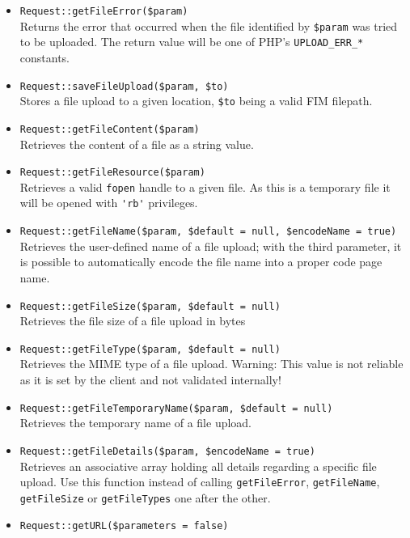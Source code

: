 \documentclass{scrartcl}
\begin{document}
\begin{itemize}
         \item \lstinline!Request::getFileError($param)! \\
            Returns the error that occurred when the file identified by \lstinline!$param! was tried to be uploaded. The return value will be one of PHP's \lstinline!UPLOAD_ERR_*! constants.
         \item \lstinline!Request::saveFileUpload($param, $to)! \\
            Stores a file upload to a given location, \lstinline!$to! being a valid FIM filepath.
         \item \lstinline!Request::getFileContent($param)! \\
            Retrieves the content of a file as a string value.
         \item \lstinline!Request::getFileResource($param)! \\
            Retrieves a valid \lstinline!fopen! handle to a given file. As this is a temporary file it will be opened with \lstinline!'rb'! privileges.
         \item \lstinline!Request::getFileName($param, $default = null, $encodeName = true)! \\
            Retrieves the user-defined name of a file upload; with the third parameter, it is possible to automatically encode the file name into a proper code page name.
         \item \lstinline!Request::getFileSize($param, $default = null)! \\
            Retrieves the file size of a file upload in bytes
         \item \lstinline!Request::getFileType($param, $default = null)! \\
            Retrieves the MIME type of a file upload. Warning: This value is not reliable as it is set by the client and not validated internally!
         \item \lstinline!Request::getFileTemporaryName($param, $default = null)! \\
            Retrieves the temporary name of a file upload.
         \item \lstinline!Request::getFileDetails($param, $encodeName = true)! \\
            Retrieves an associative array holding all details regarding a specific file upload. Use this function instead of calling \lstinline!getFileError!, \lstinline!getFileName!, \lstinline!getFileSize! or \lstinline!getFileTypes! one after the other.
         \item \lstinline!Request::getURL($parameters = false)! \\

\end{itemize}
\end{document}
